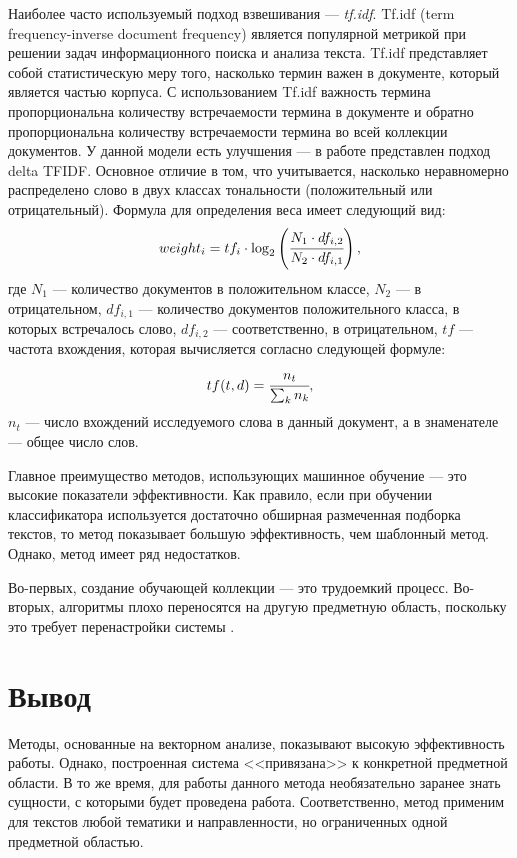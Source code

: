 Наиболее часто используемый подход взвешивания --- \textit{tf.idf}\cite{tf}. Tf.idf (term frequency-inverse document frequency) является популярной метрикой при решении задач информационного поиска и анализа текста. Tf.idf представляет собой статистическую меру того, насколько термин важен в документе, который является частью корпуса. С использованием Tf.idf важность термина пропорциональна количеству встречаемости термина в документе и обратно пропорциональна количеству встречаемости термина во всей
коллекции документов.
У данной модели есть улучшения --- в работе \cite{delta} представлен подход delta TFIDF. Основное отличие в том, что учитывается, насколько неравномерно распределено слово в двух классах тональности (положительный или отрицательный). Формула для определения веса имеет следующий вид: 
\begin{equation}
	weight_i = tf_i \cdot \log_2\left(\cfrac{N_1 \cdot df_{i, 2}}{N_2 \cdot df_{i, 1}}\right),
\end{equation} 
где $N_1$ --- количество документов в положительном классе, $N_2$ --- в отрицательном, $df_{i, 1}$ --- количество документов положительного класса, в которых встречалось слово, $df_{i, 2}$ --- соответственно, в отрицательном, $tf$ --- частота вхождения, которая вычисляется согласно следующей формуле:
\begin{equation}
	tf(t, d) = \cfrac{n_t}{\sum_{k}n_k},
\end{equation}
$n_t$ --- число вхождений исследуемого слова в данный документ, а в знаменателе --- общее число слов.

Главное преимущество методов, использующих машинное обучение --- это высокие показатели эффективности. Как правило, если при обучении классификатора используется достаточно обширная размеченная подборка текстов, то метод показывает большую эффективность, чем шаблонный метод. Однако, метод имеет ряд недостатков. 

Во-первых, создание обучающей коллекции --- это трудоемкий процесс. Во-вторых, алгоритмы плохо переносятся на другую предметную область, поскольку это требует перенастройки системы \cite{rework}. 
\section{Вывод}
Методы, основанные на векторном анализе, показывают высокую эффективность работы. Однако, построенная система <<привязана>> к конкретной предметной области. В то же время, для работы данного метода необязательно заранее знать сущности, с которыми будет проведена работа. Соответственно, метод применим для текстов любой тематики и направленности, но ограниченных одной предметной областью.